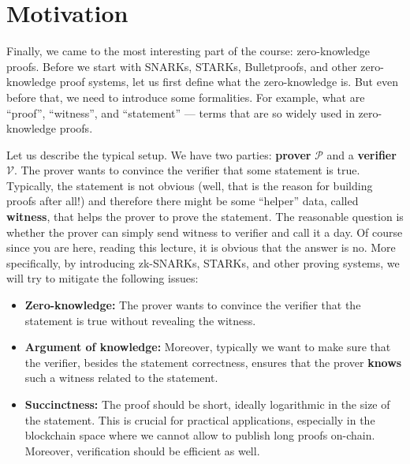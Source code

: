 \documentclass[../lecture-notes.tex]{subfiles}
\begin{document}
\section{Motivation}

Finally, we came to the most interesting part of the course: zero-knowledge proofs. Before we start with SNARKs, 
STARKs, Bulletproofs, and other zero-knowledge proof systems, let us first define what the zero-knowledge is. But even before 
that, we need to introduce some formalities. For example, what are ``proof'', ``witness'', and ``statement'' --- terms that are so widely used in zero-knowledge proofs.

Let us describe the typical setup. We have two parties: \textbf{prover} $\mathcal{P}$ and a \textbf{verifier} $\mathcal{V}$. The prover wants to convince the verifier that some statement is true. Typically, the statement is not obvious (well, that is the reason for building proofs after all!) and therefore there might be some ``helper'' data, called \textbf{witness}, that helps the prover to prove the statement. The reasonable question is whether the prover can simply send witness to verifier and call it a day. Of course since you are here, reading this lecture, it is obvious that the answer is no. More specifically, by introducing zk-SNARKs, STARKs, and other proving systems, we will try to mitigate the following issues:
\begin{itemize}
    \item \textbf{Zero-knowledge:} The prover wants to convince the verifier that the statement is true without revealing the witness. 
    \item \textbf{Argument of knowledge:} Moreover, typically we want to make sure that the verifier, besides the statement correctness, ensures that the prover \textbf{knows} such a witness related to the statement.
    \item \textbf{Succinctness:} The proof should be short, ideally logarithmic in the size of the statement. This is crucial for practical applications, especially in the blockchain space where we cannot allow to publish long proofs on-chain. Moreover, verification should be efficient as well.
\end{itemize}
\end{document}
